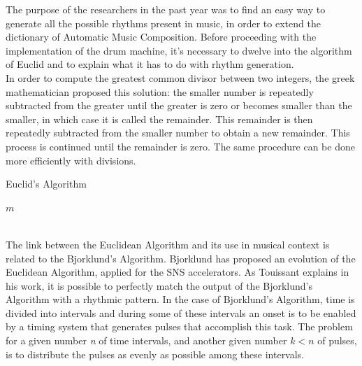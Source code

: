 \documentclass[main.tex]{subfiles}
\begin{document}
The purpose of the researchers in the past year was to find an easy way to generate all the possible rhythms present in music, in order to extend the dictionary of Automatic Music Composition\cite{Allouche:2002:AutomSeq:book}.
Before proceeding with the implementation of the drum machine, it’s necessary to dwelve into the algorithm of Euclid and to explain what it has to do with rhythm generation.\\
In order to compute the greatest common divisor between two integers, the greek mathematician proposed this solution: the smaller number is repeatedly subtracted from the greater until the greater is zero or becomes smaller than the smaller, in which case it is called the remainder. This remainder is then repeatedly subtracted from the smaller number to obtain a new remainder. This process is continued until the remainder is zero\cite{Euclid:Elements}. 
The same procedure can be done more efficiently with divisions.\\
\begin{algorithm}
\caption{Euclid's Algorithm}\label{euclid}
\begin{algorithmic}[1]
\State \Return $m$
\Else
\State {}

\EndIf
\EndProcedure
\end{algorithmic}
\end{algorithm}
\\
[10mm]
The link between the Euclidean Algorithm and its use in musical context is related to the Bjorklund's Algorithm. Bjorklund has proposed an evolution of the Euclidean Algorithm, applied for the SNS accelerators\cite{Bjorklund:2003:euclidean:rhythm}. As Touissant explains in his work\cite{Toussaint:2004:euclidean:rhythm}, it is possible to perfectly match the output of the Bjorklund's Algorithm with a rhythmic pattern.
In the case of Bjorklund's Algorithm, time is divided into intervals and during some of these intervals an onset is to be enabled by a timing system that generates pulses that accomplish this task. The problem for a given number \textit{n} of time intervals, and another given number \begin{math}k<n\end{math} of pulses, is to distribute the pulses as evenly as possible among these intervals.\\
\end{document}
